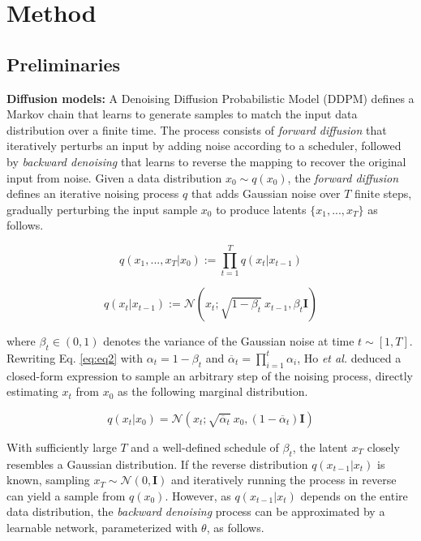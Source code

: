 \section{Method}
\label{sec:method}

\subsection{Preliminaries}\label{sec:method_preliminaries}
\textbf{Diffusion models:} A Denoising Diffusion Probabilistic Model (DDPM) defines a Markov chain that learns to generate samples to match the input data distribution over a finite time. The process consists of \emph{forward diffusion} that iteratively perturbs an input by adding noise according to a scheduler, followed by \emph{backward denoising} that learns to reverse the mapping to recover the original input from noise. Given a data distribution $x_0 \sim q(x_0)$, the \emph{forward diffusion} defines an iterative noising process $q$ that adds Gaussian noise over $T$ finite steps, gradually perturbing the input sample $x_0$ to produce latents $\{x_1, ..., x_T\}$ as follows.

\begin{equation}\label{eq:eq1}
  q(x_1, ..., x_T | x_0) := \prod_{t=1}^{T} q(x_t | x_{t-1})
\end{equation}

\begin{equation}\label{eq:eq2}
  q(x_t | x_{t-1}) := \mathcal{N}(x_t; \sqrt{1-\beta_t} ~x_{t-1}, \beta_t \mathbf{I})
\end{equation}

\noindent
where $\beta_t \in (0, 1)$ denotes the variance of the Gaussian noise at time $t \sim [1, T]$. Rewriting Eq. \ref{eq:eq2} with $\alpha_t = 1 - \beta_t$ and $\overline{\alpha}_t = \prod_{i=1}^{t} \alpha_i$, Ho \emph{et al.} \cite{ho2020denoising} deduced a closed-form expression to sample an arbitrary step of the noising process, directly estimating $x_t$ from $x_0$ as the following marginal distribution.

\begin{equation}\label{eq:eq3}
  q(x_t | x_0) = \mathcal{N}(x_t; \sqrt{\overline{\alpha}_t} ~x_0, (1-\overline{\alpha}_t) \mathbf{I})
\end{equation}

\noindent
With sufficiently large $T$ and a well-defined schedule of $\beta_t$, the latent $x_T$ closely resembles a Gaussian distribution. If the reverse distribution $q(x_{t-1} | x_t)$ is known, sampling $x_T \sim \mathcal{N}(0, \mathbf{I})$ and iteratively running the process in reverse can yield a sample from $q(x_0)$. However, as $q(x_{t-1} | x_t)$ depends on the entire data distribution, the \emph{backward denoising} process can be approximated by a learnable network, parameterized with $\theta$, as follows.

